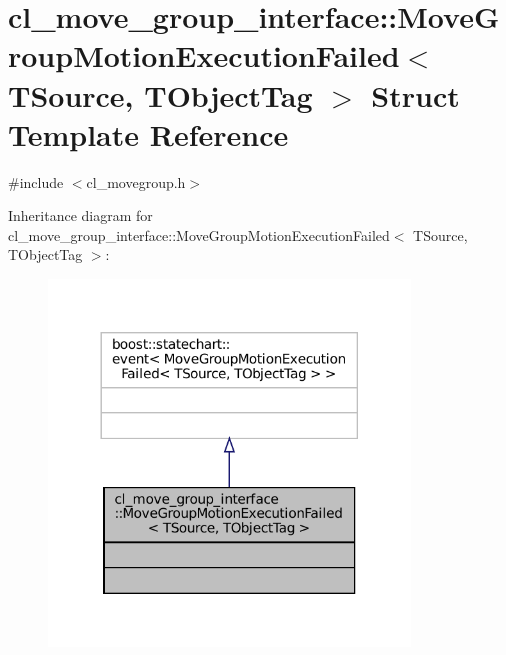\hypertarget{structcl__move__group__interface_1_1MoveGroupMotionExecutionFailed}{}\section{cl\+\_\+move\+\_\+group\+\_\+interface\+:\+:Move\+Group\+Motion\+Execution\+Failed$<$ T\+Source, T\+Object\+Tag $>$ Struct Template Reference}
\label{structcl__move__group__interface_1_1MoveGroupMotionExecutionFailed}


{\ttfamily \#include $<$cl\+\_\+movegroup.\+h$>$}



Inheritance diagram for cl\+\_\+move\+\_\+group\+\_\+interface\+:\+:Move\+Group\+Motion\+Execution\+Failed$<$ T\+Source, T\+Object\+Tag $>$\+:
\nopagebreak
\begin{figure}[H]
\begin{center}
\leavevmode
\includegraphics[width=272pt]{structcl__move__group__interface_1_1MoveGroupMotionExecutionFailed__inherit__graph}
\end{center}
\end{figure}


